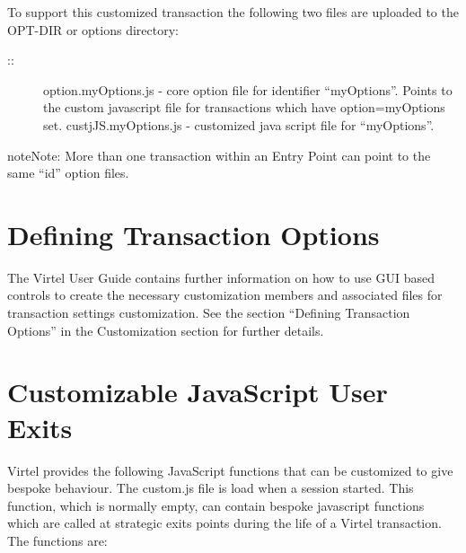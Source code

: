 \documentclass[letterpaper,10pt,english]{sphinxmanual}
\begin{document}

To support this customized transaction the following two files are uploaded to the OPT-DIR or options directory:
\begin{description}
\item[{::}] \leavevmode
option.myOptions.js  - core option file for identifier “myOptions”. Points to the custom javascript file for transactions which have option=myOptions set.
custjJS.myOptions.js - customized java script file for “myOptions”.

\end{description}

\begin{sphinxadmonition}{note}{Note:}
More than one transaction within an Entry Point can point to the same “id” option files.
\end{sphinxadmonition}

\ignorespaces 

\section{Defining Transaction Options}
\label{\detokenize{Customization:defining-transaction-options}}\label{\detokenize{Customization:index-5}}
The Virtel User Guide contains further information on how to use GUI based controls to create the necessary customization members and associated files for transaction settings customization. See the section “Defining Transaction Options” in the Customization section for further details.

\ignorespaces 

\section{Customizable JavaScript User Exits}
\label{\detokenize{Customization:customizable-javascript-user-exits}}\label{\detokenize{Customization:index-6}}
Virtel provides the following JavaScript functions that can be customized to give bespoke behaviour. The custom.js file is load when a session started. This function, which is normally empty, can contain bespoke javascript functions which are called at strategic exits points during the life of a Virtel transaction. The functions are:
\end{document}
